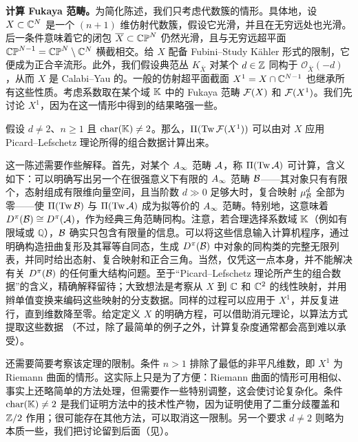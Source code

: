\noindent\textbf{计算 Fukaya 范畴。}为简化陈述，我们只考虑代数簇的情形。具体地，设 $X\subset\mathbb C^N$ 是一个 $(n+1)$ 维仿射代数簇，假设它光滑，并且在无穷远处也光滑。后一条件意味着它的闭包 $\overline X\subset\mathbb{CP}^N$ 仍然光滑，且与无穷远超平面 $\mathbb{CP}^{N-1}=\mathbb{CP}^N\setminus\mathbb C^N$ 横截相交。给 $X$ 配备 Fubini–Study Kähler 形式的限制，它便成为正合辛流形。此外，我们假设典范丛 $K_{\overline X}$ 对某个 $d\in\mathbb Z$ 同构于 $\mathcal O_{\overline X}(-d)$，从而 $X$ 是 Calabi–Yau 的。一般的仿射超平面截面 $X^1=X\cap\mathbb C^{N-1}$ 也继承所有这些性质。考虑系数取在某个域 $\mathbb K$ 中的 Fukaya 范畴 $\mathcal F(X)$ 和 $\mathcal F(X^1)$。我们先讨论 $X^1$，因为在这一情形中得到的结果略强一些。

\begingroup\renewcommand{\theoremname}{定理 A}
\begin{theorem*}\label{st:A}
假设 $d\ne2$、$n\ge1$ 且 $\operatorname{char}(\mathbb K)\ne2$。那么，$\Pi(\operatorname{Tw}\mathcal F(X^1))$ 可以由对 $X$ 应用 Picard–Lefschetz 理论所得的组合数据计算出来。
\end{theorem*}\endgroup

这一陈述需要作些解释。首先，对某个 $A_\infty$ 范畴 $\mathcal A$，称 $\Pi(\operatorname{Tw}\mathcal A)$ 可计算，含义如下：可以明确写出另一个在很强意义下有限的 $A_\infty$ 范畴 $\mathcal B$——其对象只有有限个，态射组成有限维向量空间，且当阶数 $d\gg0$ 足够大时，复合映射 $\mu^d_{\mathcal B}$ 全部为零——使 $\Pi(\operatorname{Tw}\mathcal B)$ 与 $\Pi(\operatorname{Tw}\mathcal A)$ 成为拟等价的 $A_\infty$ 范畴。特别地，这意味着 $D^{\pi}(\mathcal B)\cong D^{\pi}(\mathcal A)$，作为经典三角范畴同构。注意，若合理选择系数域 $\mathbb K$（例如有限域或 $\mathbb Q$），$\mathcal B$ 确实只包含有限量的信息。可以将这些信息输入计算机程序，通过明确构造扭曲复形及其幂等自同态，生成 $D^{\pi}(\mathcal B)$ 中对象的同构类的完整无限列表，并同时给出态射、复合映射和正合三角。当然，仅凭这一点本身，并不能解决有关 $D^{\pi}(\mathcal B)$ 的任何重大结构问题。至于“Picard–Lefschetz 理论所产生的组合数据”的含义，精确解释留待；大致想法是考察从 $X$ 到 $\mathbb C$ 和 $\mathbb C^2$ 的线性映射，并用辫单值变换来编码这些映射的分支数据。同样的过程可以应用于 $X^1$，并反复进行，直到维数降至零。给定定义 $X$ 的明确方程，可以借助消元理论，以算法方式提取这些数据
（不过，除了最简单的例子之外，计算复杂度通常都会高到难以承受）。

还需要简要考察该定理的限制。条件 $n>1$ 排除了最低的非平凡维数，即 $X^1$ 为 Riemann 曲面的情形。这实际上只是为了方便：Riemann 曲面的情形可用相似、事实上还略简单的方法处理，但需要作一些特别调整，这会使讨论复杂化。条件 $\operatorname{char}(\mathbb K)\ne2$ 是我们证明方法中的技术性产物，因为证明使用了二重分歧覆盖和 $\mathbb Z/2$ 作用；很可能存在其他方法，可以取消这一限制。另一个要求 $d\ne2$ 则略为本质一些，我们把讨论留到后面（见）。

